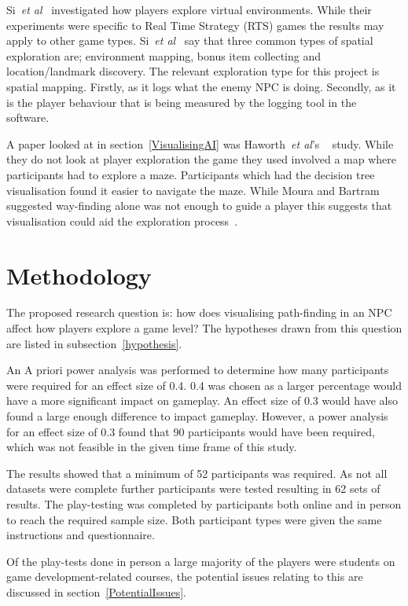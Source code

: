 \documentclass[journal]{IEEEtran}
\begin{document}
	Si~\textit{et al}~\cite{si2017} investigated how players explore virtual environments. While their experiments were specific to Real Time Strategy (RTS) games the results may apply to other game types. Si~\textit{et al}~\cite{si2017} say that three common types of spatial exploration are; environment mapping, bonus item collecting and location/landmark discovery. The relevant exploration type for this project is spatial mapping. Firstly, as it logs what the enemy NPC is doing.  Secondly, as it is the player behaviour that is being measured by the logging tool in the software.
	
	A paper looked at in section~\ref{VisualisingAI} was Haworth~\textit{et al}'s ~\cite{Haworth2010} study. While they do not look at player exploration the game they used involved a map where participants had to explore a maze. Participants which had the decision tree visualisation found it easier to navigate the maze. While Moura and Bartram~\cite{moura2014} suggested way-finding alone was not enough to guide a player this suggests that visualisation could aid the exploration process~\cite{Haworth2010}.
	
	\section{Methodology} \label{methodology}
	The proposed research question is: how does visualising path-finding in an NPC affect how players explore a game level? The hypotheses drawn from this question are listed in subsection~\ref{hypothesis}.  
	
	An A priori power analysis was performed to determine how many participants were required for an effect size of 0.4. 0.4 was chosen as a larger percentage would have a more significant impact on gameplay.  An effect size of 0.3 would have also found a large enough difference to impact gameplay. However, a power analysis for an effect size of 0.3 found that 90 participants would have been required, which was not feasible in the given time frame of this study.
	
	The results showed that a minimum of 52 participants was required. As not all datasets were complete further participants were tested resulting in 62 sets of results. The play-testing was completed by participants both online and in person to reach the required sample size. Both participant types were given the same instructions and questionnaire. 
	
	Of the play-tests done in person a large majority of the players were students on game development-related courses, the potential issues relating to this are discussed in section~\ref{PotentialIssues}. 
	
\end{document}
